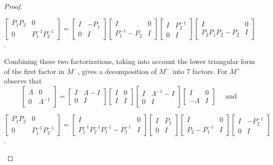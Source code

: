 \documentclass[10pt]{amsart}
\theoremstyle{remark}
\begin{document}
\begin{proof}
\begin{center}
    $\left[\begin{array}{ccc} P_1 P_2 & 0 \\ 0 & P_1^{-1} P_2^{-1}\end{array}\right] 
    =  
    \left[\begin{array}{ccc} I & -P_1 \\ 0 & I\end{array}\right]
    \left[\begin{array}{ccc} I & 0 \\ P_1^{-1} - P_2 & I\end{array}\right]
    \left[\begin{array}{ccc} I & P_2^{-1} \\ 0 & I \end{array}\right]
    \left[\begin{array}{ccc} I & 0 \\ P_2 P_1 P_2 - P_2 & I\end{array}\right]$.
\end{center}
Combining these two factorizations, taking into account the lower triangular form of the first factor in $M^-$, gives a decomposition of $M^-$ into $7$ factors. For $M^+$ observe that
\[
    \begin{bmatrix} \Lambda & 0 \\ 0 & \Lambda^{-1}   \end{bmatrix}
    = 
    \begin{bmatrix} I & \Lambda - I \\ 0 & I  \end{bmatrix}
    \begin{bmatrix} I & 0 \\ I & I  \end{bmatrix}
    \begin{bmatrix} I &  \Lambda^{-1} - I \\ 0 & I  \end{bmatrix}
    \begin{bmatrix} I & 0 \\ -\Lambda  & I  \end{bmatrix} \quad \text{ and }
\]
\begin{center}
    $\left[\begin{array}{ccc} P_1 P_2 & 0 \\ 0 & P_1^{-1} P_2^{-1} \end{array}\right] 
    =  
    \left[\begin{array}{ccc} I & 0 \\ P_1^{-1}P_2^{-1}P_1^{-1}-P_1^{-1} & I\end{array}\right]\left[\begin{array}{ccc} I & P_1 \\ 0 & I\end{array}\right]\left[\begin{array}{ccc} I & 0 \\ P_2-P_1^{-1} & I\end{array}\right]\left[\begin{array}{ccc} I & -P_2^{-1} \\ 0 & I \end{array}\right]$. \qedhere

\end{center}
\end{proof}
\end{document}
